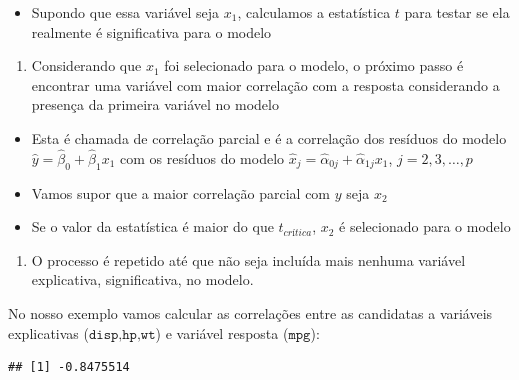 \documentclass[
]{book}
\newenvironment{Shaded}{\begin{snugshade}}{\end{snugshade}}
\newcommand{\FunctionTok}[1]{\textcolor[rgb]{0.00,0.00,0.00}{#1}}
\newcommand{\NormalTok}[1]{#1}
\newcommand{\SpecialCharTok}[1]{\textcolor[rgb]{0.00,0.00,0.00}{#1}}
\providecommand{\tightlist}{%
  \setlength{\itemsep}{0pt}\setlength{\parskip}{0pt}}
\begin{document}
\begin{itemize}
\tightlist
\item
  Supondo que essa variável seja \(x_1\), calculamos a estatística \(t\) para testar se ela realmente é significativa para o modelo
\end{itemize}

\begin{enumerate}
\def\labelenumi{\arabic{enumi}.}
\setcounter{enumi}{1}
\tightlist
\item
  Considerando que \(x_1\) foi selecionado para o modelo, o próximo passo é encontrar uma variável com maior correlação com a resposta considerando a presença da primeira variável no modelo
\end{enumerate}

\begin{itemize}
\tightlist
\item
  Esta é chamada de correlação parcial e é a correlação dos resíduos do modelo \(\hat{y}=\hat{\beta}_0+\hat{\beta}_1x_1\) com os resíduos do modelo \(\hat{x}_j=\hat{\alpha}_{0j}+\hat{\alpha}_{1j}x_1\), \(j=2,3,\ldots,p\)
\item
  Vamos supor que a maior correlação parcial com \(y\) seja \(x_2\)
\item
  Se o valor da estatística é maior do que \(t_{crítica}\), \(x_2\) é selecionado para o modelo
\end{itemize}

\begin{enumerate}
\def\labelenumi{\arabic{enumi}.}
\setcounter{enumi}{2}
\tightlist
\item
  O processo é repetido até que não seja incluída mais nenhuma variável explicativa, significativa, no modelo.
\end{enumerate}

No nosso exemplo vamos calcular as correlações entre as candidatas a variáveis explicativas (\(\texttt{disp,hp,wt}\)) e variável resposta (\(\texttt{mpg}\)):

\begin{Shaded}
\end{Shaded}

\begin{verbatim}
## [1] -0.8475514
\end{verbatim}
\end{document}
